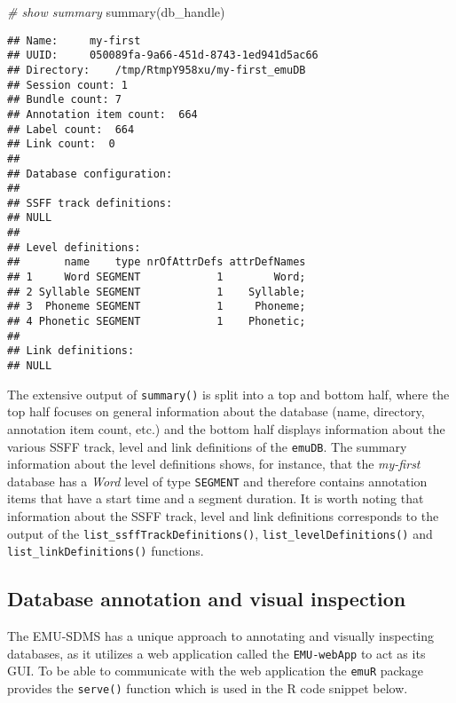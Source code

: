 \documentclass[
]{book}
\newenvironment{Shaded}{\begin{snugshade}}{\end{snugshade}}
\newcommand{\CommentTok}[1]{\textcolor[rgb]{0.56,0.35,0.01}{\textit{#1}}}
\newcommand{\FunctionTok}[1]{\textcolor[rgb]{0.00,0.00,0.00}{#1}}
\newcommand{\NormalTok}[1]{#1}
\begin{document}
\begin{Shaded}
\begin{Highlighting}[]
\CommentTok{\# show summary}
\FunctionTok{summary}\NormalTok{(db\_handle)}
\end{Highlighting}
\end{Shaded}

\begin{verbatim}
## Name:     my-first 
## UUID:     050089fa-9a66-451d-8743-1ed941d5ac66 
## Directory:    /tmp/RtmpY958xu/my-first_emuDB 
## Session count: 1 
## Bundle count: 7 
## Annotation item count:  664 
## Label count:  664 
## Link count:  0 
## 
## Database configuration:
## 
## SSFF track definitions:
## NULL
## 
## Level definitions:
##       name    type nrOfAttrDefs attrDefNames
## 1     Word SEGMENT            1        Word;
## 2 Syllable SEGMENT            1    Syllable;
## 3  Phoneme SEGMENT            1     Phoneme;
## 4 Phonetic SEGMENT            1    Phonetic;
## 
## Link definitions:
## NULL
\end{verbatim}

The extensive output of \texttt{summary()} is split into a top and bottom half, where the top half focuses on general information about the database (name, directory, annotation item count, etc.) and the bottom half displays information about the various SSFF track, level and link definitions of the \texttt{emuDB}. The summary information about the level definitions shows, for instance, that the \emph{my-first} database has a \emph{Word} level of type \texttt{SEGMENT} and therefore contains annotation items that have a start time and a segment duration. It is worth noting that information about the SSFF track, level and link definitions corresponds to the output of the \texttt{list\_ssffTrackDefinitions()}, \texttt{list\_levelDefinitions()} and \texttt{list\_linkDefinitions()} functions.

\hypertarget{database-annotation-and-visual-inspection}{%
\subsection{Database annotation and visual inspection}\label{database-annotation-and-visual-inspection}}

The EMU-SDMS has a unique approach to annotating and visually inspecting databases, as it utilizes a web application called the \texttt{EMU-webApp} to act as its GUI. To be able to communicate with the web application the \texttt{emuR} package provides the \texttt{serve()} function which is used in the R code snippet below.
\end{document}
